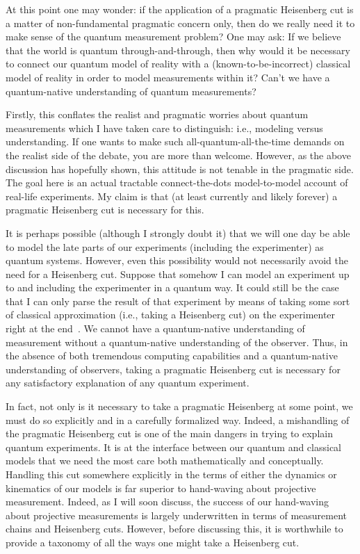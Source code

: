 \documentclass[12pt,prd,superscriptaddress,floatfix,amsmath,amssymb,amsfonts,nofootinbib]{revtex4-2}
\begin{document}
At this point one may wonder: if the application of a pragmatic Heisenberg cut is a matter of non-fundamental pragmatic concern only, then do we really need it to make sense of the quantum measurement problem? One may ask: If we believe that the world is quantum through-and-through, then why would it be necessary to connect our quantum model of reality with a (known-to-be-incorrect) classical model of reality in order to model measurements within it? Can't we have a quantum-native understanding of quantum measurements?

Firstly, this conflates the realist and pragmatic worries about quantum measurements which I have taken care to distinguish: i.e., modeling versus understanding. If one wants to make such all-quantum-all-the-time demands on the realist side of the debate, you are more than welcome. However, as the above discussion has hopefully shown, this attitude is not tenable in the pragmatic side. The goal here is an actual tractable connect-the-dots model-to-model account of real-life experiments. My claim is that (at least currently and likely forever) a pragmatic Heisenberg cut is necessary for this. 

It is perhaps possible (although I strongly doubt it) that we will one day be able to model the late parts of our experiments (including the experimenter) as quantum systems. However, even this possibility would not necessarily avoid the need for a Heisenberg cut. Suppose that somehow I can model an experiment up to and including the experimenter in a quantum way. It could still be the case that I can only parse the result of that experiment by means of taking some sort of classical approximation (i.e., taking a Heisenberg cut) on the experimenter right at the end~\cite{WallaceEmergentMultiverse}. We cannot have a quantum-native understanding of measurement without a quantum-native understanding of the observer. Thus, in the absence of both tremendous computing capabilities and a quantum-native understanding of observers, taking a pragmatic Heisenberg cut is necessary for any satisfactory explanation of any quantum experiment.

In fact, not only is it necessary to take a pragmatic Heisenberg at some point, we must do so explicitly and in a carefully formalized way. Indeed, a mishandling of the pragmatic Heisenberg cut is one of the main dangers in trying to explain quantum experiments. It is at the interface between our quantum and classical models that we need the most care both mathematically and conceptually. Handling this cut somewhere explicitly in the terms of either the dynamics or kinematics of our models is far superior to hand-waving about projective measurement. Indeed, as I will soon discuss, the success of our hand-waving about projective measurements is largely underwritten in terms of measurement chains and Heisenberg cuts. However, before discussing this, it is worthwhile to provide a taxonomy of all the ways one might take a Heisenberg cut.
\end{document}
